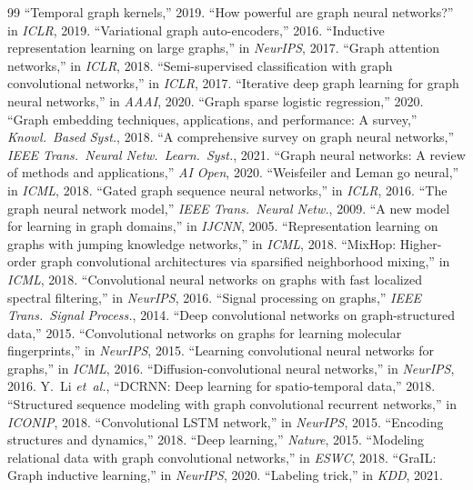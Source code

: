 \documentclass[journal,onecolumn]{IEEEtran}
\begin{document}
\begin{thebibliography}{99}
 ``Temporal graph kernels,'' 2019.
 ``How powerful are graph neural networks?'' in \emph{ICLR}, 2019.
 ``Variational graph auto-encoders,'' 2016.
 ``Inductive representation learning on large graphs,'' in \emph{NeurIPS}, 2017.
 ``Graph attention networks,'' in \emph{ICLR}, 2018.
 ``Semi-supervised classification with graph convolutional networks,'' in \emph{ICLR}, 2017.
 ``Iterative deep graph learning for graph neural networks,'' in \emph{AAAI}, 2020.
 ``Graph sparse logistic regression,'' 2020.
 ``Graph embedding techniques, applications, and performance: A survey,'' \emph{Knowl.\ Based Syst.}, 2018.
 ``A comprehensive survey on graph neural networks,'' \emph{IEEE Trans.\ Neural Netw.\ Learn.\ Syst.}, 2021.
 ``Graph neural networks: A review of methods and applications,'' \emph{AI Open}, 2020.
 ``Weisfeiler and Leman go neural,'' in \emph{ICML}, 2018.
 ``Gated graph sequence neural networks,'' in \emph{ICLR}, 2016.
 ``The graph neural network model,'' \emph{IEEE Trans.\ Neural Netw.}, 2009.
 ``A new model for learning in graph domains,'' in \emph{IJCNN}, 2005.
 ``Representation learning on graphs with jumping knowledge networks,'' in \emph{ICML}, 2018.
 ``MixHop: Higher-order graph convolutional architectures via sparsified neighborhood mixing,'' in \emph{ICML}, 2018.
 ``Convolutional neural networks on graphs with fast localized spectral filtering,'' in \emph{NeurIPS}, 2016.
 ``Signal processing on graphs,'' \emph{IEEE Trans.\ Signal Process.}, 2014.
 ``Deep convolutional networks on graph-structured data,'' 2015.
 ``Convolutional networks on graphs for learning molecular fingerprints,'' in \emph{NeurIPS}, 2015.
 ``Learning convolutional neural networks for graphs,'' in \emph{ICML}, 2016.
 ``Diffusion-convolutional neural networks,'' in \emph{NeurIPS}, 2016.
 Y.~Li \emph{et~al.}, ``DCRNN: Deep learning for spatio-temporal data,'' 2018.
 ``Structured sequence modeling with graph convolutional recurrent networks,'' in \emph{ICONIP}, 2018.
 ``Convolutional LSTM network,'' in \emph{NeurIPS}, 2015.
 ``Encoding structures and dynamics,'' 2018.
 ``Deep learning,'' \emph{Nature}, 2015.
 ``Modeling relational data with graph convolutional networks,'' in \emph{ESWC}, 2018.
 ``GraIL: Graph inductive learning,'' in \emph{NeurIPS}, 2020.
 ``Labeling trick,'' in \emph{KDD}, 2021.
\end{thebibliography}
\end{document}
